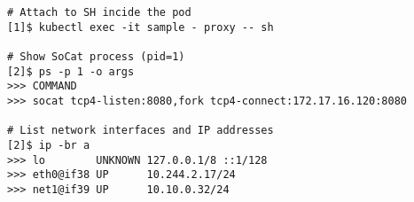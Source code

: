 \begin{lstfloat}
\begin{lstlisting}[style=mybashstyle,
caption={Ukázka nastavení proxy Podu},
label={code:proxyValid}
]
# Attach to SH incide the pod
[1]$ kubectl exec -it sample - proxy -- sh

# Show SoCat process (pid=1)
[2]$ ps -p 1 -o args
>>> COMMAND
>>> socat tcp4-listen:8080,fork tcp4-connect:172.17.16.120:8080

# List network interfaces and IP addresses
[2]$ ip -br a
>>> lo        UNKNOWN 127.0.0.1/8 ::1/128 
>>> eth0@if38 UP      10.244.2.17/24
>>> net1@if39 UP      10.10.0.32/24
\end{lstlisting}
\end{lstfloat}
